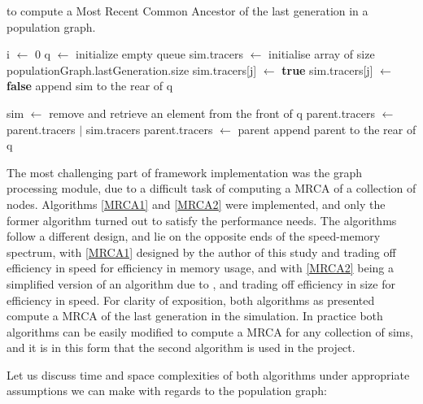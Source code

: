 \documentclass{l4proj}
\begin{document}
\begin{algorithm}
\centering
\caption{to compute a Most Recent Common Ancestor of the last generation in a population graph.}
\label{MRCA2}
\begin{algorithmic}[1]
\State i $\gets$ 0
\State q $\gets$ initialize empty queue
    \State sim.tracers $\gets$ initialise array of size populationGraph.lastGeneration.size
            \State sim.tracers[j] $\gets$ \textbf{true}
        \Else{ }
            \State sim.tracers[j] $\gets$ \textbf{false}
        \EndIf
    \EndFor
    \State append sim to the rear of q
\EndFor

\State sim $\gets$ remove and retrieve an element from the front of q
        \State parent.tracers $\gets$ parent.tracers $|$ sim.tracers 
    \Else
        \State parent.tracers $\gets$  
    \EndIf
     \Return parent 
    \EndIf
    \State append parent to the rear of q
\EndFor
\EndWhile

\EndProcedure
\end{algorithmic}
\end{algorithm}

The most challenging part of framework implementation was the graph processing module, due to a difficult task of computing a MRCA of a collection of nodes. Algorithms \ref{MRCA1} and \ref{MRCA2} were implemented, and only the former algorithm turned out to satisfy the performance needs. The algorithms follow a different design, and lie on the opposite ends of the speed-memory spectrum, with \ref{MRCA1} designed by the author of this study and trading off efficiency in speed for efficiency in memory usage, and with \ref{MRCA2} being a simplified version of an algorithm due to \textcite{rohde04}, and trading off efficiency in size for efficiency in speed. For clarity of exposition, both algorithms as presented compute a MRCA of the last generation in the simulation. In practice both algorithms can be easily modified to compute a MRCA for any collection of sims, and it is in this form that the second algorithm is used in the project.

Let us discuss time and space complexities of both algorithms under appropriate assumptions we can make with regards to the population graph:
\end{document}
